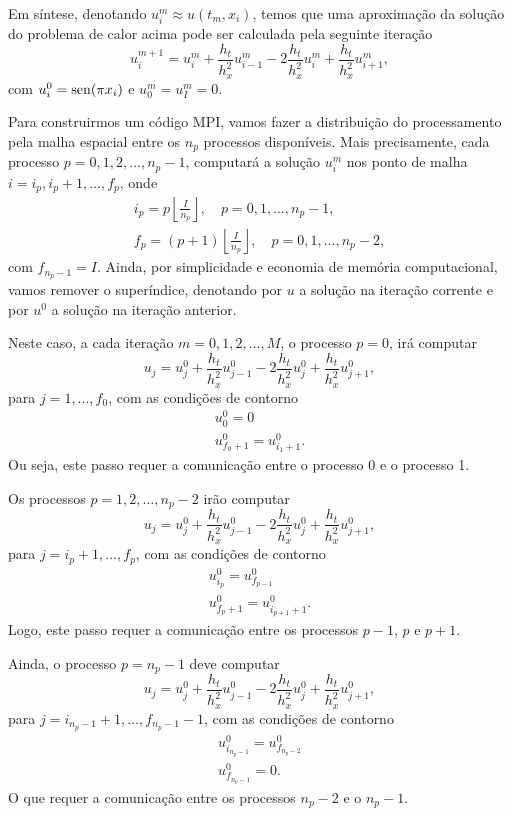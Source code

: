 Em síntese, denotando $u^m_i \approx u(t_m, x_i)$, temos que uma aproximação da solução do problema de calor acima pode ser calculada pela seguinte iteração
\begin{equation}
  u^{m+1}_i = u^m_i + \frac{h_t}{h_x^2}u^m_{i-1} - 2\frac{h_t}{h_x^2}u^m_{i} + \frac{h_t}{h_x^2}u^m_{i+1},
\end{equation}
com $u^0_i = \operatorname{sen}(\pi x_i)$ e $u^m_0=u^m_I = 0$.

Para construirmos um código MPI, vamos fazer a distribuição do processamento pela malha espacial entre os $n_p$ processos disponíveis. Mais precisamente, cada processo $p = 0, 1, 2, \dotsc, n_p-1$, computará a solução $u^m_i$ nos ponto de malha $i=i_p, i_p+1, \dotsc, f_p$, onde
\begin{gather}
  i_p = p\left\lfloor\frac{I}{n_p}\right\rfloor, \quad p=0,1,\dotsc,n_p-1,\\
  f_p = (p+1)\left\lfloor\frac{I}{n_p}\right\rfloor,\quad p=0,1,\dotsc,n_p-2,
\end{gather}
com $f_{n_p-1}=I$. Ainda, por simplicidade e economia de memória computacional, vamos remover o superíndice, denotando por $u$ a solução na iteração corrente e por $u^0$ a solução na iteração anterior.

Neste caso, a cada iteração $m=0,1,2,\ldots, M$, o processo $p=0$, irá computar
\begin{equation}
  u_j = u^0_j + \frac{h_t}{h_x^2}u^0_{j-1} - 2\frac{h_t}{h_x^2}u^0_{j} + \frac{h_t}{h_x^2}u^0_{j+1},
\end{equation}
para $j=1,\dotsc,f_0$, com as condições de contorno
\begin{gather}
  u^0_0 = 0\\
  u^0_{f_0+1} = u^0_{i_1+1}.
\end{gather}
Ou seja, este passo requer a comunicação entre o processo 0 e o processo 1.

Os processos $p=1,2,\dotsc,n_p-2$ irão computar
\begin{equation}
  u_j = u^0_j + \frac{h_t}{h_x^2}u^0_{j-1} - 2\frac{h_t}{h_x^2}u^0_{j} + \frac{h_t}{h_x^2}u^0_{j+1},
\end{equation}
para $j=i_p+1,\dotsc, f_p$, com as condições de contorno
\begin{gather}
  u^0_{i_p} = u^0_{f_{p-1}}\\
  u^0_{f_p+1} = u^0_{i_{p+1}+1}.
\end{gather}
Logo, este passo requer a comunicação entre os processos $p-1$, $p$ e $p+1$.

Ainda, o processo $p=n_p-1$ deve computar
\begin{equation}
  u_j = u^0_j + \frac{h_t}{h_x^2}u^0_{j-1} - 2\frac{h_t}{h_x^2}u^0_{j} + \frac{h_t}{h_x^2}u^0_{j+1},
\end{equation}
para $j=i_{n_p-1}+1,\dotsc, f_{n_p-1}-1$, com as condições de contorno
\begin{gather}
  u^0_{i_{n_p-1}} = u^0_{f_{n_p-2}}\\
  u^0_{f_{n_p-1}} = 0.
\end{gather}
O que requer a comunicação entre os processos $n_p-2$ e o $n_p-1$.

